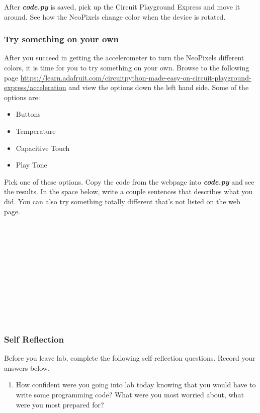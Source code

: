 \documentclass[11pt]{article}
\providecommand{\tightlist}{%
      \setlength{\itemsep}{0pt}\setlength{\parskip}{0pt}}
\begin{document}
After \textbf{\emph{code.py}} is saved, pick up the Circuit Playground
Express and move it around. See how the NeoPixels change color when the
device is rotated.

    \hypertarget{try-something-on-your-own}{%
\subsubsection{Try something on your
own}\label{try-something-on-your-own}}

After you succeed in getting the accelerometer to turn the NeoPixels
different colors, it is time for you to try something on your own.
Browse to the following page
\url{https://learn.adafruit.com/circuitpython-made-easy-on-circuit-playground-express/acceleration}
and view the options down the left hand side. Some of the options are:

\begin{itemize}
\tightlist
\item
  Buttons
\item
  Temperature
\item
  Capacitive Touch
\item
  Play Tone
\end{itemize}

Pick one of these options. Copy the code from the webpage into
\textbf{\emph{code.py}} and see the results. In the space below, write a
couple sentences that describes what you did. You can also try something
totally different that's not listed on the web page.

\begin{verbatim}











\end{verbatim}
\newpage
    \hypertarget{self-reflection}{%
\subsubsection{Self Reflection}\label{self-reflection}}

Before you leave lab, complete the following self-reflection questions.
Record your answers below.

\begin{enumerate}
\def\labelenumi{\arabic{enumi}.}
\tightlist
\item
  How confident were you going into lab today knowing that you would
  have to write some programming code? What were you most worried about,
  what were you most prepared for?
\end{enumerate}
\end{document}
